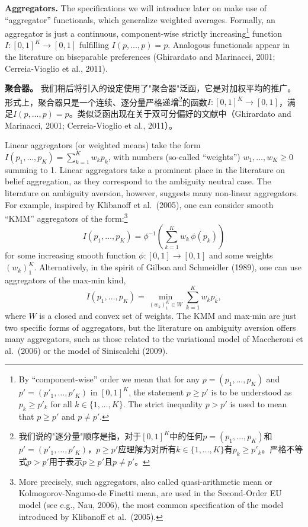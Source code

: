 \documentclass[12pt,a4paper]{article}
\newenvironment{original}
  {\par\noindent\ignorespaces}
  {\par}
\newenvironment{translation}
  {\par\noindent{\color{transblue}\ignorespaces}}
  {\par\medskip}
\begin{document}
\begin{original}
\textbf{Aggregators.} The specifications we will introduce later on make use of ``aggregator'' functionals, which generalize weighted averages. Formally, an aggregator is just a continuous, component-wise strictly increasing\footnote{By ``component-wise'' order we mean that for any $p = (p_{1}, \dots, p_{K})$ and $p' = (p'_{1}, \dots, p'_{K})$ in $[0,1]^{K}$, the statement $p \geq p'$ is to be understood as $p_{k} \geq p'_{k}$ for all $k \in \{1, \dots, K\}$. The strict inequality $p > p'$ is used to mean that $p \geq p'$ and $p \neq p'$.} function $I: [0,1]^{K} \to [0,1]$ fulfilling $I(p, \dots, p) = p$. Analogous functionals appear in the literature on biseparable preferences (Ghirardato and Marinacci, 2001; Cerreia-Vioglio et al., 2011).
\end{original}

\begin{translation}
\textbf{聚合器。} 我们稍后将引入的设定使用了"聚合器"泛函，它是对加权平均的推广。形式上，聚合器只是一个连续、逐分量严格递增\footnote{我们说的"逐分量"顺序是指，对于$[0,1]^{K}$中的任何$p = (p_{1}, \dots, p_{K})$和$p' = (p'_{1}, \dots, p'_{K})$，$p \geq p'$应理解为对所有$k \in \{1, \dots, K\}$有$p_{k} \geq p'_{k}$。严格不等式$p > p'$用于表示$p \geq p'$且$p \neq p'$。}的函数$I: [0,1]^{K} \to [0,1]$，满足$I(p, \dots, p) = p$。类似泛函出现在关于双可分偏好的文献中（Ghirardato and Marinacci, 2001; Cerreia-Vioglio et al., 2011）。
\end{translation}

\begin{original}
Linear aggregators (or weighted means) take the form $I(p_{1}, \dots, p_{K}) = \sum_{k=1}^{K} w_{k} p_{k}$, with numbers (so-called ``weights'') $w_{1}, \dots, w_{K} \geq 0$ summing to 1. Linear aggregators take a prominent place in the literature on belief aggregation, as they correspond to the ambiguity neutral case. The literature on ambiguity aversion, however, suggests many non-linear aggregators. For example, inspired by Klibanoff et al.\ (2005), one can consider smooth ``KMM'' aggregators of the form:\footnote{More precisely, such aggregators, also called quasi-arithmetic mean or Kolmogorov-Nagumo-de Finetti mean, are used in the Second-Order EU model (see e.g., Nau, 2006), the most common specification of the model introduced by Klibanoff et al.\ (2005).}
\[
I(p_{1}, \dots, p_{K}) = \phi^{-1}\!\left( \sum_{k=1}^{K} w_{k} \, \phi(p_{k}) \right) \tag{1}
\]
for some increasing smooth function $\phi: [0,1] \to [0,1]$ and some weights $(w_{k})_{1}^{K}$. Alternatively, in the spirit of Gilboa and Schmeidler (1989), one can use aggregators of the max-min kind,
\[
I(p_{1}, \dots, p_{K}) = \min_{(w_{k})_{1}^{K} \in W} \sum_{k=1}^{K} w_{k} p_{k}, \tag{2}
\]
where $W$ is a closed and convex set of weights. The KMM and max-min are just two specific forms of aggregators, but the literature on ambiguity aversion offers many aggregators, such as those related to the variational model of Maccheroni et al.\ (2006) or the model of Siniscalchi (2009).
\end{original}
\end{document}
